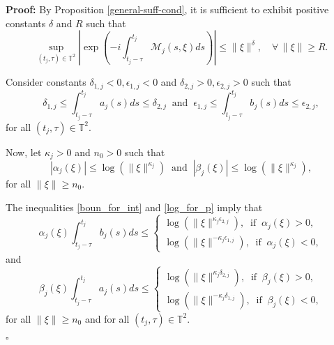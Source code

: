 \documentclass[12pt]{elsarticle}
\numberwithin{equation}{section}
\newenvironment{proof}[1][\noindent \textbf{Proof: }]{#1}{ \hfill $\square$ \vspace{2mm}}
\begin{document}
\begin{proof}
	By Proposition \ref{general-suff-cond}, it is sufficient to exhibit  positive constants $\delta$ and $R$ such that
	\begin{equation*}\label{ex_bounded_log}
\sup_{(t_j,\tau)\in\mathbb{T}^2}	\left |
	\exp \left(-i\int_{t_j-\tau}^{t_j}\mathcal{M}_j(s,\xi)ds \right) 
	\right| 
	\leq  \|\xi\|^{\delta}, \quad \forall
	\, \|\xi\|\geq R.
	\end{equation*}
	
Consider constants $\delta_{1,j}<0, \epsilon_{1,j} <0$ and $\delta_{2,j}>0 ,\epsilon_{2,j}>0$ such that
	\begin{equation}\label{boun_for_int}
	\delta_{1,j} \leq \int_{t_j - \tau}^{t_j}a_j(s) ds \leq \delta_{2,j}
	\ \textrm{ and } \
	\epsilon_{1,j} \leq \int_{t_j - \tau}^{t_j}b_j(s) ds \leq \epsilon_{2,j},
	\end{equation}
for all $(t_j,\tau)\in\mathbb{T}^2$.

	
	Now, let 	$\kappa_j>0$ and $n_0>0$ 	such that
	\begin{equation}\label{log_for_p}
	|\alpha_j(\xi)| \leq  \log(\|\xi\|^{\kappa_j})
	\ \textrm{ and } \
	|\beta_j(\xi)| \leq \log(\|\xi\|^{\kappa_j}),
		\end{equation}
	for all $\|\xi\|\geq  n_{0}$.
	
	
	The inequalities \eqref{boun_for_int}  and \eqref{log_for_p} imply that 
		\begin{equation}\label{alpha-b}
		\alpha_j(\xi) \int_{t_j - \tau}^{t_j}b_j(s) ds \leq   \left \{
		\begin{array}{l}
		\log(\|\xi\|^{\kappa_j \epsilon_{2,j}}), \ \textrm{ if } \  \alpha_j(\xi) >0, \\[2mm]
		\log(\|\xi\|^{-\kappa_j\epsilon_{1,j}}), \ \textrm{ if } \  \alpha_j(\xi) <0,
		\end{array}\right.
		\end{equation}
		and
		\begin{equation*}\label{beta-a}
		\beta_j(\xi) \int_{t_j - \tau}^{t_j}a_j(s) ds \leq   \left \{
		\begin{array}{l}
		\log(\|\xi\|^{\kappa_j \delta_{2,j}}), \ \textrm{ if } \  \beta_j(\xi) >0, \\[2mm]
		\log(\|\xi\|^{-\kappa_j\delta_{1,j}}), \ \textrm{ if } \  \beta_j(\xi) <0,
		\end{array}\right.
		\end{equation*}
		for all $\|\xi\|\geq  n_{0}$  and for all $(t_j,\tau)\in\mathbb{T}^2$.
	

\end{proof}
\end{document}
